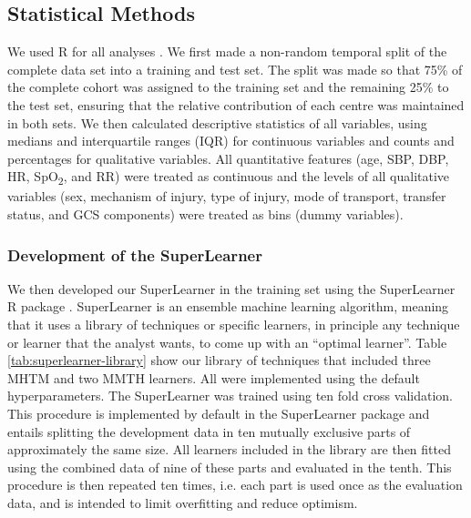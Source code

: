 \documentclass[10pt,letterpaper]{article}\usepackage[]{graphicx}\usepackage[]{color}
\begin{document}
\subsection*{Statistical Methods}
We used R for all analyses \cite{R}. We first made a non-random temporal split
of the complete data set into a training and test set. The split was made so
that 75\% of the complete cohort was assigned to the training set and the
remaining 25\% to the test set, ensuring that the relative contribution of each
centre was maintained in both sets. We then calculated descriptive statistics of
all variables, using medians and interquartile ranges (IQR) for continuous
variables and counts and percentages for qualitative variables. All quantitative
features (age, SBP, DBP, HR, SpO\textsubscript{2}, and RR) were treated as
continuous and the levels of all qualitative variables (sex, mechanism of
injury, type of injury, mode of transport, transfer status, and GCS components)
were treated as bins (dummy variables).

\subsubsection*{Development of the SuperLearner}
We then developed our SuperLearner in the training set using the SuperLearner R
package \cite{SuperLearner}. SuperLearner is an ensemble machine learning
algorithm, meaning that it uses a library of techniques or specific learners, in
principle any technique or learner that the analyst wants, to come up with an
``optimal learner''. Table \ref{tab:superlearner-library} show our library of
techniques that included three MHTM and two MMTH learners. All were implemented
using the default hyperparameters. The SuperLearner was trained using ten fold
cross validation. This procedure is implemented by default in the SuperLearner
package and entails splitting the development data in ten mutually exclusive
parts of approximately the same size. All learners included in the library are
then fitted using the combined data of nine of these parts and evaluated in the
tenth. This procedure is then repeated ten times, i.e. each part is used once as
the evaluation data, and is intended to limit overfitting and reduce optimism.
\end{document}
